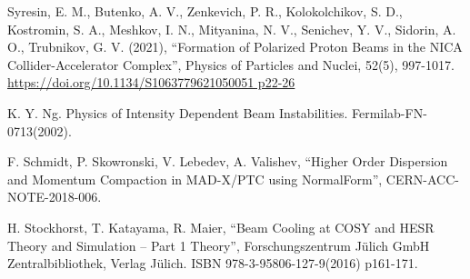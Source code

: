 \documentclass[a4paper,
               keeplastbox,   %
               ]{jacow}
\begin{document}
	{\printbibliography}
	{
	\begin{thebibliography}{9}
	
	Syresin, E. M., Butenko, A. V., Zenkevich, P. R., Kolokolchikov, S. D., Kostromin, S. A., Meshkov, I. N., Mityanina, N. V., Senichev, Y. V., Sidorin, A. O., Trubnikov, G. V. (2021), ``Formation of Polarized Proton Beams in the NICA Collider-Accelerator Complex'', Physics of Particles and Nuclei, 52(5), 997-1017.
	\url{https://doi.org/10.1134/S1063779621050051 p22-26}
	
	K. Y. Ng. Physics of Intensity Dependent Beam Instabilities. Fermilab-FN-0713(2002).

	F. Schmidt, P. Skowronski, V. Lebedev, A. Valishev, ``Higher Order Dispersion and Momentum Compaction in MAD-X/PTC using NormalForm'', CERN-ACC-NOTE-2018-006.
	
	H. Stockhorst, T. Katayama, R. Maier, ``Beam Cooling at COSY and HESR Theory and Simulation – Part 1 Theory'', Forschungszentrum Jülich GmbH Zentralbibliothek, Verlag Jülich. ISBN 978-3-95806-127-9(2016) p161-171.

	\end{thebibliography}
} 
\end{document}
